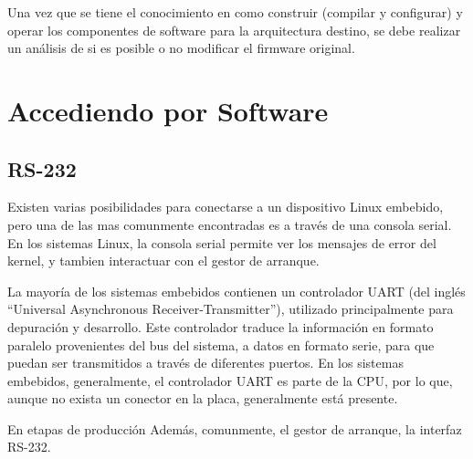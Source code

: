 \documentclass[conference]{IEEEtran}
\begin{document}
Una vez que se tiene el conocimiento en como construir (compilar y configurar)
y operar los componentes de software para la arquitectura destino, se
debe realizar un análisis de si es posible o no modificar el firmware original.


\section{Accediendo por Software}

\subsection{RS-232}

Existen varias posibilidades para conectarse a un dispositivo 
Linux embebido, pero una de las mas comunmente encontradas es
a través de una consola serial. En los sistemas Linux, la 
consola serial permite ver los mensajes de error del kernel,
y tambien interactuar con el gestor de arranque.

La mayoría de los sistemas embebidos contienen un controlador 
UART (del inglés ``Universal Asynchronous Receiver-Transmitter''),
utilizado principalmente para depuración y desarrollo.
Este controlador traduce la información en formato paralelo
provenientes del bus del sistema, a datos en formato serie,
para que puedan ser transmitidos a través de diferentes puertos.
En los sistemas embebidos, generalmente, el controlador UART es parte de la CPU,
por lo que, aunque no exista un conector en la placa, generalmente
está presente.

En etapas de producción
Además, comunmente, el gestor de arranque, 
la interfaz RS-232.

%
%
%




\end{document}

